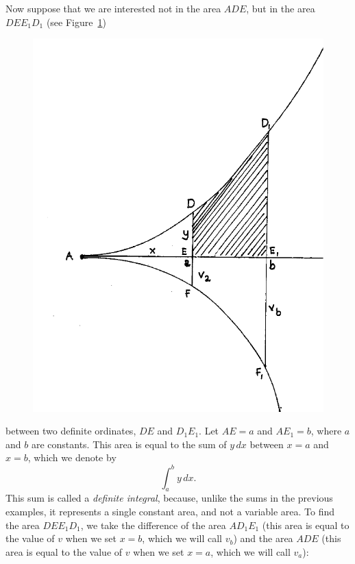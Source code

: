 \documentclass[polutonikogreek,english,twoside,openright]{article}
\begin{document}
\label{defint}
Now suppose that we are interested not in the area $ADE$, but in the area $DEE_1D_1$ (see Figure~\ref{sumab2})
\begin{figure}[htp]
\begin{center}
\includegraphics[width=\textwidth]{fig/Figure47}
\caption{}
\label{sumab2}
\vspace{-10pt}
\end{center}
\end{figure}  between two definite ordinates, $DE$ and $D_1E_1$.  Let $AE =a$ and $AE_1 =b$, where $a$ and $b$ are constants.  This area is equal to the sum of $y\,dx$ between $x=a$ and $x=b$, which we denote by
$$\int_a^b\!y\,dx.$$
This sum is called a {\em definite integral}, because, unlike the sums in the previous examples, it represents a single constant area, and not a variable area.  To find the area $DEE_1D_1$, we take the difference of the area $AD_1E_1$ (this area is equal to the value of $v$ when we set $x=b$, which we will call $v_b$) and the area $ADE$ (this area is equal to the value of $v$ when we set $x=a$, which we will call $v_a$):
\end{document}
